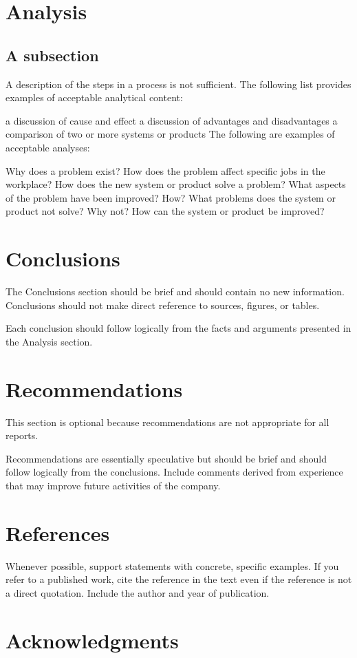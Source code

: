 \documentclass{article}
\begin{document}
\section{Analysis} 
\subsection{A subsection}
A description of the steps in a process is not sufficient. The following list provides examples of acceptable analytical content:

a discussion of cause and effect
a discussion of advantages and disadvantages
a comparison of two or more systems or products
The following are examples of acceptable analyses:

Why does a problem exist?
How does the problem affect specific jobs in the workplace?
How does the new system or product solve a problem?
What aspects of the problem have been improved? How?
What problems does the system or product not solve? Why not?
How can the system or product be improved?

\section{Conclusions}
The Conclusions section should be brief and should contain no new information. Conclusions should not make direct reference to sources, figures, or tables.

Each conclusion should follow logically from the facts and arguments presented in the Analysis section.

\section{Recommendations}
This section is optional because recommendations are not appropriate for all reports.

Recommendations are essentially speculative but should be brief and should follow logically from the conclusions. Include comments derived from experience that may improve future activities of the company.

\newpage
\section*{References}
Whenever possible, support statements with concrete, specific examples. If you refer to a published work, cite the reference in the text even if the reference is not a direct quotation. Include the author and year of publication.

\newpage
\section*{Acknowledgments}
\end{document}
